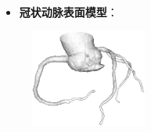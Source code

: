 \begin{frame}
\begin{itemize}
  \item \textbf{冠状动脉表面模型}：
\end{itemize}
\begin{figure}
\centering
\includegraphics[width=1.5in]{../../Figures/coronary/model}
\end{figure}
\end{frame} 


